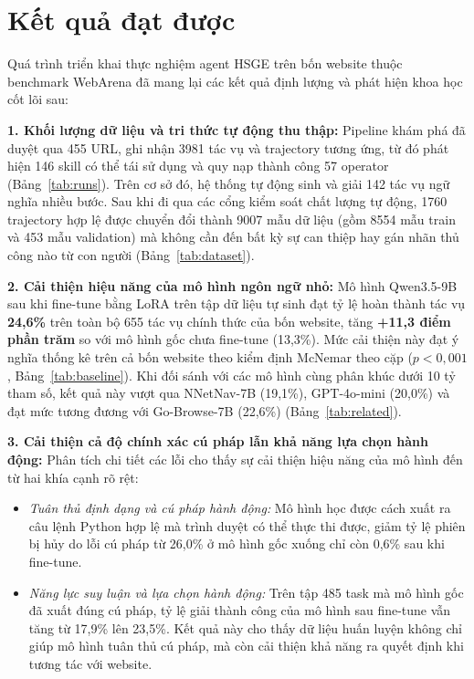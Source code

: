 \section{Kết quả đạt được}
\label{sec:intro-results}

Quá trình triển khai thực nghiệm agent HSGE trên bốn website thuộc benchmark WebArena đã mang lại các kết quả định lượng và phát hiện khoa học cốt lõi sau:

\textbf{1. Khối lượng dữ liệu và tri thức tự động thu thập:}
Pipeline khám phá đã duyệt qua 455 URL, ghi nhận 3981 tác vụ và trajectory tương ứng, từ đó phát hiện 146 skill có thể tái sử dụng và quy nạp thành công 57 operator (Bảng~\ref{tab:runs}). Trên cơ sở đó, hệ thống tự động sinh và giải 142 tác vụ ngữ nghĩa nhiều bước. Sau khi đi qua các cổng kiểm soát chất lượng tự động, 1760 trajectory hợp lệ được chuyển đổi thành 9007 mẫu dữ liệu (gồm 8554 mẫu train và 453 mẫu validation) mà không cần đến bất kỳ sự can thiệp hay gán nhãn thủ công nào từ con người (Bảng~\ref{tab:dataset}).

\textbf{2. Cải thiện hiệu năng của mô hình ngôn ngữ nhỏ:}
Mô hình Qwen3.5-9B sau khi fine-tune bằng LoRA trên tập dữ liệu tự sinh đạt tỷ lệ hoàn thành tác vụ \textbf{24,6\%} trên toàn bộ 655 tác vụ chính thức của bốn website, tăng \textbf{+11,3 điểm phần trăm} so với mô hình gốc chưa fine-tune (13,3\%). Mức cải thiện này đạt ý nghĩa thống kê trên cả bốn website theo kiểm định McNemar theo cặp ($p < 0{,}001$, Bảng~\ref{tab:baseline}). Khi đối sánh với các mô hình cùng phân khúc dưới 10 tỷ tham số, kết quả này vượt qua NNetNav-7B (19,1\%), GPT-4o-mini (20,0\%) và đạt mức tương đương với Go-Browse-7B (22,6\%) (Bảng~\ref{tab:related}).

\textbf{3. Cải thiện cả độ chính xác cú pháp lẫn khả năng lựa chọn hành động:}
Phân tích chi tiết các lỗi cho thấy sự cải thiện hiệu năng của mô hình đến từ hai khía cạnh rõ rệt:
\begin{itemize}
  \item \emph{Tuân thủ định dạng và cú pháp hành động:} Mô hình học được cách xuất ra câu lệnh Python hợp lệ mà trình duyệt có thể thực thi được, giảm tỷ lệ phiên bị hủy do lỗi cú pháp từ 26,0\% ở mô hình gốc xuống chỉ còn 0,6\% sau khi fine-tune.
  \item \emph{Năng lực suy luận và lựa chọn hành động:} Trên tập 485 task mà mô hình gốc đã xuất đúng cú pháp, tỷ lệ giải thành công của mô hình sau fine-tune vẫn tăng từ 17,9\% lên 23,5\%. Kết quả này cho thấy dữ liệu huấn luyện không chỉ giúp mô hình tuân thủ cú pháp, mà còn cải thiện khả năng ra quyết định khi tương tác với website.
\end{itemize}

